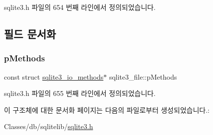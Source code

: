 sqlite3.\+h 파일의 654 번째 라인에서 정의되었습니다.



\subsection{필드 문서화}
\mbox{\label{structsqlite3__file_adfc58b2d7514112375d7330e2881bc70}} 
\subsubsection{\texorpdfstring{p\+Methods}{pMethods}}
{\footnotesize\ttfamily const struct \hyperlink{structsqlite3__io__methods}{sqlite3\+\_\+io\+\_\+methods}$\ast$ sqlite3\+\_\+file\+::p\+Methods}



sqlite3.\+h 파일의 655 번째 라인에서 정의되었습니다.



이 구조체에 대한 문서화 페이지는 다음의 파일로부터 생성되었습니다.\+:\begin{DoxyCompactItemize}
\item 
Classes/db/sqlitelib/\hyperlink{sqlite3_8h}{sqlite3.\+h}\end{DoxyCompactItemize}
